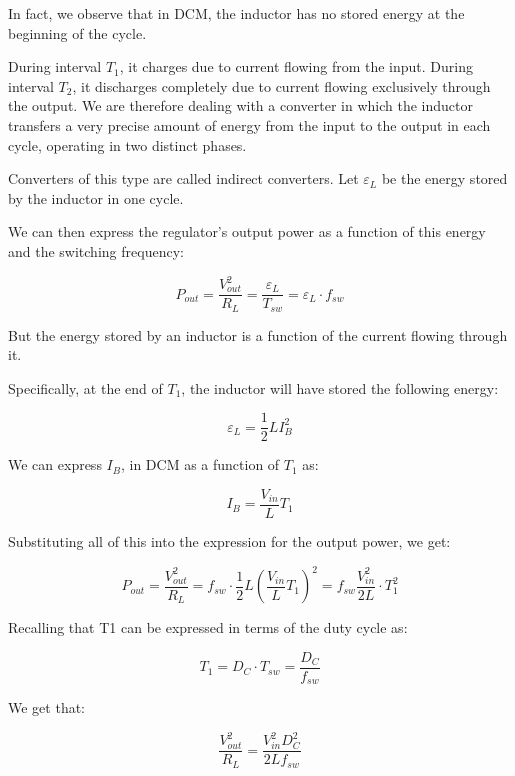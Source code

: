 \documentclass[../main.tex]{subfiles}
\begin{document}
In fact, we observe that in DCM, the inductor has no stored energy at the beginning of the cycle. 

During interval $T_1$, it charges due to current flowing from the input. During interval $T_2$, it discharges completely due to current flowing exclusively through the output. We are therefore dealing with a converter in which the inductor transfers a very precise amount of energy from the input to the output in each cycle, operating in two distinct phases. 

Converters of this type are called indirect converters. Let $\varepsilon_L$ be the energy stored by the inductor in one cycle.

We can then express the regulator’s output power as a function of this energy and the switching frequency:

\begin{equation}
	P_{out} = \frac{V^2_{out}}{R_L} = \frac{\varepsilon_L}{T_{sw}} = \varepsilon_L \cdot f_{sw}
\end{equation}

But the energy stored by an inductor is a function of the current flowing through it. 

Specifically, at the end of $T_1$, the inductor will have stored the following energy:

\begin{equation}
	\varepsilon_L = \frac{1}{2}LI^2_B
\end{equation}

We can express $I_B$, in DCM as a function of $T_1$ as:

\begin{equation}
	I_B = \frac{V_{in}}{L}T_1
\end{equation}

Substituting all of this into the expression for the output power, we get:

\begin{equation}
	P_{out} = \frac{V^2_{out}}{R_L} = f_{sw} \cdot \frac{1}{2}L \left( \frac{V_{in}}{L} T_1 \right)^2 = f_{sw} \frac{V^2_{in}}{2L} \cdot T^2_1
\end{equation}


Recalling that T1 can be expressed in terms of the duty cycle as:

\begin{equation}
	T_1 = D_C \cdot T_{sw} = \frac{D_C}{f_{sw}}
\end{equation}


We get that:

\begin{equation}
	\frac{V_{out}^2}{R_L} = \frac{V_{in}^2D^2_C}{2Lf_{sw}}
\end{equation}
\end{document}
